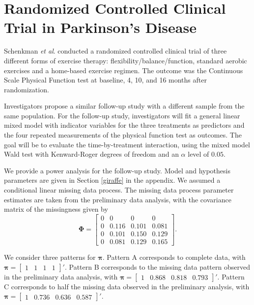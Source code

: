 \documentclass[11pt]{article}
\begin{document}
\section{Randomized Controlled Clinical Trial in Parkinson's Disease}
\label{illustrativeexample}

Schenkman \textit{et al}. \cite{schenkman_exercise_2012} conducted a randomized controlled clinical trial of three different forms of exercise therapy: flexibility/balance/function, standard aerobic exercises and a home-based exercise regimen. The outcome was the Continuous Scale Physical Function test at baseline, 4, 10, and 16 months after randomization. 

Investigators propose a similar follow-up study with a different sample from the same population. For the follow-up study, investigators will fit a general linear mixed model with indicator variables for the three treatments as predictors and the four repeated measurements of the physical function test as outcomes. The goal will be to evaluate the time-by-treatment interaction, using the mixed model Wald test with Kenward-Roger degrees of freedom and an $\alpha$ level of $0.05$.

We provide a power analysis for the follow-up study. Model and hypothesis parameters are given in Section \ref{giraffe} in the appendix. We assumed a conditional linear missing data process. The missing data process parameter estimates are taken from the preliminary data analysis, with the covariance matrix of the missingness given by 
\begin{equation}
\boldsymbol{\Phi}=
\begin{bmatrix}
0&0&0&0\\
0&0.116&0.101&0.081\\
0&0.101&0.150&0.129\\
0&0.081&0.129&0.165
\end{bmatrix}.
\end{equation}

We consider three patterns for $\boldsymbol{\pi}$. Pattern A corresponds to complete data, with $\boldsymbol{\pi}=\begin{bmatrix}1&1&1&1\end{bmatrix}'$. Pattern B corresponds to the missing data pattern observed in the preliminary data analysis, with $\boldsymbol{\pi}=\begin{bmatrix}1&0.868&0.818&0.793\end{bmatrix}'$. Pattern C corresponds to half the missing data observed in the preliminary analysis, with $\boldsymbol{\pi}=\begin{bmatrix} 1&0.736&0.636&0.587 \end{bmatrix}'$.
\end{document}
